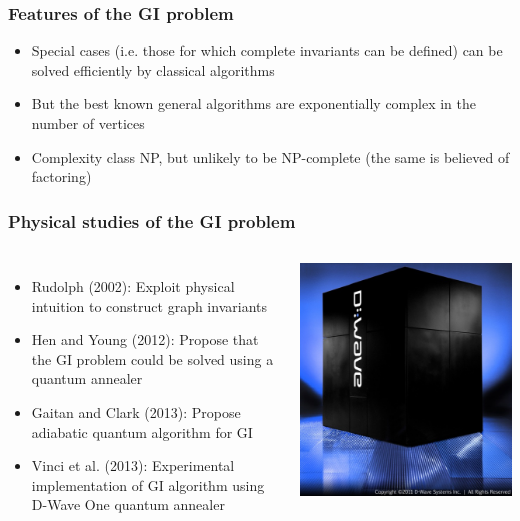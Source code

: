 \documentclass{beamer}
\begin{document}
\begin{frame}
  \frametitle{Features of the GI problem}
  \begin{itemize}
    \item Special cases (i.e. those for which complete invariants can be
      defined) can be solved efficiently by classical algorithms
    \item But the best known general algorithms are exponentially complex in
      the number of vertices
    \item Complexity class \alert{NP}, but unlikely to be NP-complete (the same
      is believed of factoring)
  \end{itemize}
\end{frame}
\begin{frame}
  \frametitle{Physical studies of the GI problem}
    \begin{columns}
      \begin{itemize}
        \item Rudolph (2002):
          Exploit physical intuition to construct graph invariants
        \item Hen and Young (2012):
          Propose that the GI problem could be solved using a
          quantum annealer
        \item Gaitan and Clark (2013):
          Propose adiabatic quantum algorithm for GI
        \item Vinci et al. (2013):
          Experimental implementation of GI algorithm using D-Wave One quantum
          annealer
      \end{itemize}
      \includegraphics[width=\textwidth]{d_wave_one_system}
    \end{columns}
\end{frame}
\end{document}
